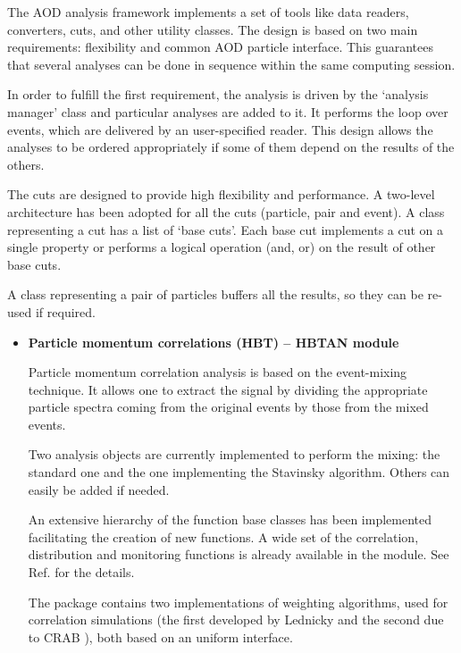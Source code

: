 \documentclass[12pt,a4paper,twoside]{article}
\begin{document}
{\begin{itemize}
  The AOD analysis framework implements a set of tools like data readers,
  converters, cuts, and other utility classes.
  The design is based on two main requirements: flexibility and common
  AOD particle interface. This guarantees that several analyses can be
  done in sequence within the same computing session.

  In order to fulfill the first requirement, the analysis is driven by the
  `analysis manager' class and particular analyses are added to it.
  It performs the loop over events, which are delivered by an
  user-specified reader. This design allows the analyses to be ordered
  appropriately  if some  of them depend on the results of the others.

  The cuts are designed to provide high flexibility
  and performance. A two-level architecture has been adopted
  for all the cuts (particle, pair and event). A class representing a cut
  has a list of `base cuts'. Each base cut implements a cut on a
  single property or performs a logical operation (and, or) on the result of
  other base cuts.

  A class representing a pair of particles buffers all the results,
  so they can be re-used if required.

  \vspace{-0.2cm}
  \begin{itemize}
  \item[ ] \textbf{Particle momentum correlations (HBT) -- HBTAN module}

    Particle momentum correlation analysis is based on the event-mixing technique.
    It allows one to extract the signal by dividing the appropriate
    particle spectra coming from the original events by those from the
    mixed events.

    Two analysis objects are currently implemented to perform the mixing:
    the standard one and the one implementing the Stavinsky
    algorithm\cite{CH6Ref:Stavinsky}. Others can easily be added if needed.

    An extensive hierarchy of the function base classes has been implemented
    facilitating the creation of new functions.
    A wide set of the correlation, distribution and monitoring
    functions is already available in the module. See Ref.\cite{CH6Ref:HBTAN}
    for the details. 

    The package contains two implementations of weighting algorithms, used
    for correlation simulations (the first developed by Lednicky
    \cite{CH6Ref:Weights}  and the second due to CRAB \cite{CH6Ref:CRAB}), both
    based on an uniform interface.


\end{itemize}
\end{itemize}}
\end{document}

